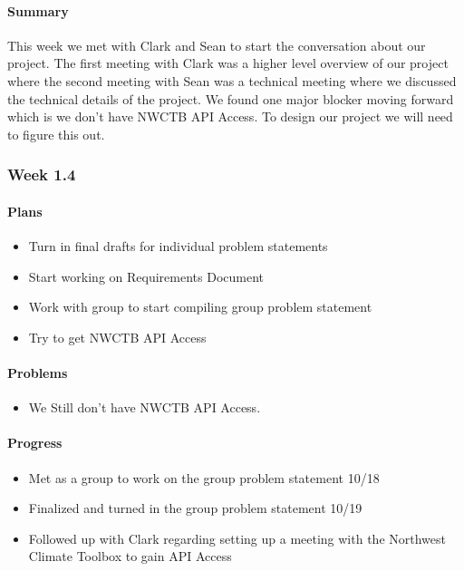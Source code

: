 \documentclass[onecolumn, draftclsnofoot,10pt, compsoc]{article}
\begin{document}
		    \paragraph{Summary} \hfill \break
		    	This week we met with Clark and Sean to start the conversation about our project. The first meeting with Clark was a higher level overview of our project where the second meeting with Sean was a technical meeting where we discussed the technical details of the project. We found one major blocker moving forward which is we don't have NWCTB API Access. To design our project we will need to figure this out.\\ 
		        
		\subsubsection{Week 1.4}
		
		    \paragraph{Plans} \hfill \break
		        
		        \begin{itemize}
		            \item Turn in final drafts for individual problem statements
		            \item Start working on Requirements Document
		            \item Work with group to start compiling group problem statement
		            \item Try to get NWCTB API Access
		        \end{itemize}
		        
		    \paragraph{Problems} \hfill \break
		        
		        \begin{itemize}
		            \item We Still don't have NWCTB API Access.
		        \end{itemize}
		        
		    \paragraph{Progress} \hfill \break
		    
		        \begin{itemize}
		            \item Met as a group to work on the group problem statement 10/18
		            \item Finalized and turned in the group problem statement 10/19
		            \item Followed up with Clark regarding setting up a meeting with the Northwest Climate Toolbox to gain API Access
		        \end{itemize}
		        
\end{document}
